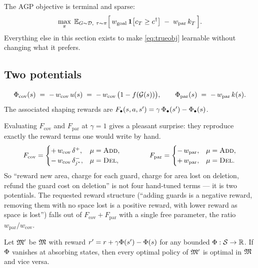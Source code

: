 \documentclass[11pt,a4paper]{article}
\begin{document}
The AGP objective is terminal and sparse:
\begin{equation}\label{eq:trueobj}
  \max_{\pi}\;
  \mathbb{E}_{G \sim \mathcal{D},\ \tau \sim \pi}
  \Bigl[\, w_{\mathrm{goal}}\,\mathbf{1}\!\left[c_T \ge c^{\dagger}\right] \;-\; w_{\mathrm{par}}\, k_T \,\Bigr].
\end{equation}
Everything else in this section exists to make \eqref{eq:trueobj} learnable without
changing what it prefers.

\subsection{Two potentials}

\begin{definition}
\[
  \Phi_{\mathrm{cov}}(s) \;=\; -\,w_{\mathrm{cov}}\, u(s) \;=\; -\,w_{\mathrm{cov}}\,\bigl(1 - f(\mathcal{G}(s))\bigr),
  \qquad
  \Phi_{\mathrm{par}}(s) \;=\; -\,w_{\mathrm{par}}\, k(s).
\]
The associated shaping rewards are $F_\bullet(s,a,s') = \gamma\,\Phi_\bullet(s') - \Phi_\bullet(s)$.
\end{definition}

Evaluating $F_{\mathrm{cov}}$ and $F_{\mathrm{par}}$ at $\gamma = 1$ gives a pleasant surprise:
they reproduce exactly the reward terms one would write by hand.
\[
  F_{\mathrm{cov}} =
  \begin{cases}
    +\,w_{\mathrm{cov}}\,\delta^{+}, & \mu = \textsc{Add}, \\
    -\,w_{\mathrm{cov}}\,\delta^{-}_{j^\star}, & \mu = \textsc{Del},
  \end{cases}
  \qquad\qquad
  F_{\mathrm{par}} =
  \begin{cases}
    -\,w_{\mathrm{par}}, & \mu = \textsc{Add}, \\
    +\,w_{\mathrm{par}}, & \mu = \textsc{Del}.
  \end{cases}
\]
So ``reward new area, charge for each guard, charge for area lost on deletion, refund the
guard cost on deletion'' is not four hand-tuned terms --- it is two potentials. The
requested reward structure (``adding guards is a negative reward, removing them with no
space lost is a positive reward, with lower reward as space is lost'') falls out of
$F_{\mathrm{cov}} + F_{\mathrm{par}}$ with a single free parameter, the ratio
$w_{\mathrm{par}}/w_{\mathrm{cov}}$.

\begin{theorem}\label{thm:ng}
Let $\mathfrak{M}' $ be $\mathfrak{M}$ with reward $r' = r + \gamma\Phi(s') - \Phi(s)$ for any bounded
$\Phi: \mathcal{S} \to \mathbb{R}$. If $\Phi$ vanishes at absorbing states, then every optimal policy
of $\mathfrak{M}'$ is optimal in $\mathfrak{M}$ and vice versa.
\end{theorem}
\end{document}
